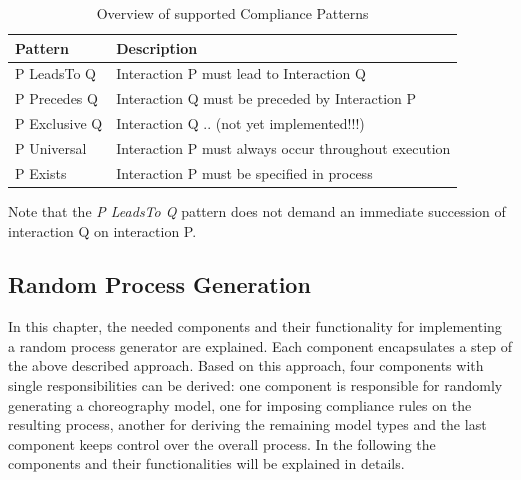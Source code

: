 \documentclass[runningheads]{llncs}
\begin{document}
\begin{table}[]
\centering
\resizebox{12cm}{!}
{
\begin{tabular}{l|l}
Pattern		      & Description  \\ \hline
P LeadsTo Q       & Interaction P must lead to Interaction Q	  	 \\
P Precedes Q      & Interaction Q must be preceded by Interaction P	  \\
P Exclusive Q     & Interaction Q .. (not yet implemented!!!) \\ 		
P Universal  	  & Interaction P must always occur throughout execution \\
P Exists		  & Interaction P must be specified in process \\
\end{tabular}%
}
\caption{Overview of supported Compliance Patterns}
\label{tab:compl_patterns}
\end{table}

Note that the \textit{P LeadsTo Q} pattern does not demand an immediate succession of interaction Q on interaction P.

\subsection{Random Process Generation}
In this chapter, the needed components and their functionality for implementing a random process generator are explained. Each component encapsulates a step of the above described approach. Based on this approach, four components with single responsibilities can be derived: one component is responsible for randomly generating a choreography model, one for imposing compliance rules on the resulting process, another for deriving the remaining model types and the last component keeps control over the overall process. In the following the components and their functionalities will be explained in details.
\end{document}

